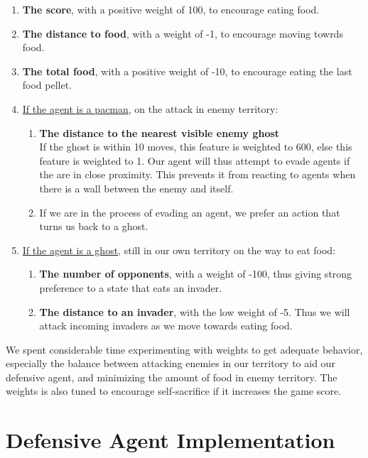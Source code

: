 \documentclass[]{article}
\begin{document}
\begin{enumerate}
    
\item \textbf{The score}, with a positive weight of 100, to encourage eating food.
\item \textbf{The distance to food}, with a weight of -1, to encourage moving towrds food.
\item \textbf{The total food}, with a positive weight of -10, to encourage eating the last food pellet.

\item \underline{If the agent is a pacman}, on the attack in enemy territory:
\begin{enumerate}
    \item \textbf{The distance to the nearest visible enemy ghost}\\
    If the ghost is within 10 moves, this feature is weighted to 600, else this feature is weighted to 1. Our agent will thus attempt to evade agents if the are in close proximity. This prevents it from reacting to agents when there is a wall between the enemy and itself.
    \item If we are in the process of evading an agent, we prefer an action that turns us back to a ghost.
\end{enumerate}

\item \underline{If the agent is a ghost},  still in our own territory on the way to eat food:
\begin{enumerate}
    \item \textbf{The number of opponents}, with a weight of -100, thus giving strong preference to a state that eats an invader.
    \item \textbf{The distance to an invader}, with the low weight of -5. Thus we will attack incoming invaders as we move towards eating food.
\end{enumerate}
\end{enumerate}

We spent considerable time experimenting with weights to get adequate behavior, especially the balance between attacking enemies in our territory to aid our defensive agent, and minimizing the amount of food in enemy territory. The weights is also tuned to encourage self-sacrifice if it increases the game score. 

\section{Defensive Agent Implementation}
\end{document}
